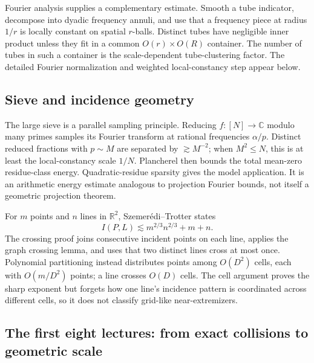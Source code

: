 Fourier analysis supplies a complementary estimate. Smooth a tube indicator, decompose into dyadic frequency annuli, and use that a frequency piece at radius \(1/r\) is locally constant on spatial \(r\)-balls. Distinct tubes have negligible inner product unless they fit in a common \(O(r)\times O(R)\) container. The number of tubes in such a container is the scale-dependent tube-clustering factor. The detailed Fourier normalization and weighted local-constancy step appear below.

\subsection{Sieve and incidence geometry}\label{04-visual-computing-ii-ch033-sieve-and-incidence-geometry}

\hypertarget{04-visual-computing-ii-ch033-sieve-and-incidence-geometry}{}

The large sieve is a parallel sampling principle. Reducing \(f:[N]\to\mathbb C\) modulo many primes samples its Fourier transform at rational frequencies \(\alpha/p\). Distinct reduced fractions with \(p\sim M\) are separated by \(\gtrsim M^{-2}\); when \(M^2\le N\), this is at least the local-constancy scale \(1/N\). Plancherel then bounds the total mean-zero residue-class energy. Quadratic-residue sparsity gives the model application. It is an arithmetic energy estimate analogous to projection Fourier bounds, not itself a geometric projection theorem.

For \(m\) points and \(n\) lines in \(\mathbb R^2\), Szemerédi--Trotter states \[I(P,L)\lesssim m^{2/3}n^{2/3}+m+n.\] The crossing proof joins consecutive incident points on each line, applies the graph crossing lemma, and uses that two distinct lines cross at most once. Polynomial partitioning instead distributes points among \(O(D^2)\) cells, each with \(O(m/D^2)\) points; a line crosses \(O(D)\) cells. The cell argument proves the sharp exponent but forgets how one line's incidence pattern is coordinated across different cells, so it does not classify grid-like near-extremizers.

\subsection{The first eight lectures: from exact collisions to geometric scale}\label{04-visual-computing-ii-ch033-the-first-eight-lectures-from-exact-collisions-to-geometric-scale}

\hypertarget{04-visual-computing-ii-ch033-the-first-eight-lectures-from-exact-collisions-to-geometric-scale}{}

